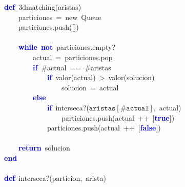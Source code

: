 \noindent
\mbox{}\textbf{\textcolor{Blue}{def}}\ 3dmatching\textcolor{BrickRed}{(}aristas\textcolor{BrickRed}{)} \\
\mbox{}\ \ \ \ particiones\ \textcolor{BrickRed}{=}\ new\ Queue \\
\mbox{}\ \ \ \ particiones\textcolor{BrickRed}{.}push\textcolor{BrickRed}{([])} \\
\mbox{} \\
\mbox{}\ \ \ \ \textbf{\textcolor{Blue}{while}}\ \textbf{\textcolor{Blue}{not}}\ particiones\textcolor{BrickRed}{.}empty? \\
\mbox{}\ \ \ \ \ \ \ \ actual\ \textcolor{BrickRed}{=}\ particiones\textcolor{BrickRed}{.}pop \\
\mbox{}\ \ \ \ \ \ \ \ \textbf{\textcolor{Blue}{if}}\ $\#$actual\ \textcolor{BrickRed}{==}\ $\#$aristas \\
\mbox{}\ \ \ \ \ \ \ \ \ \ \ \ \textbf{\textcolor{Blue}{if}}\ valor\textcolor{BrickRed}{(}actual\textcolor{BrickRed}{)}\ \textcolor{BrickRed}{\textgreater{}}\ valor\textcolor{BrickRed}{(}solucion\textcolor{BrickRed}{)} \\
\mbox{}\ \ \ \ \ \ \ \ \ \ \ \ \ \ \ \ solucion\ \textcolor{BrickRed}{=}\ actual \\
\mbox{}\ \ \ \ \ \ \ \ \textbf{\textcolor{Blue}{else}} \\
\mbox{}\ \ \ \ \ \ \ \ \ \ \ \ \textbf{\textcolor{Blue}{if}}\ interseca?\textcolor{BrickRed}{(}$\mathtt{aristas[\#actual]}$\textcolor{BrickRed}{,}\ actual\textcolor{BrickRed}{)} \\
\mbox{}\ \ \ \ \ \ \ \ \ \ \ \ \ \ \ \ particiones\textcolor{BrickRed}{.}push\textcolor{BrickRed}{(}actual\ \textcolor{BrickRed}{++}\ \textcolor{BrickRed}{[}\textbf{\textcolor{Blue}{true}}\textcolor{BrickRed}{])} \\
\mbox{}\ \ \ \ \ \ \ \ \ \ \ \ particiones\textcolor{BrickRed}{.}push\textcolor{BrickRed}{(}actual\ \textcolor{BrickRed}{++}\ \textcolor{BrickRed}{[}\textbf{\textcolor{Blue}{false}}\textcolor{BrickRed}{])} \\
\mbox{} \\
\mbox{}\ \ \ \ \textbf{\textcolor{Blue}{return}}\ solucion \\
\mbox{}\textbf{\textcolor{Blue}{end}} \\
\mbox{} \\
\mbox{}\textbf{\textcolor{Blue}{def}}\ interseca?\textcolor{BrickRed}{(}particion\textcolor{BrickRed}{,}\ arista\textcolor{BrickRed}{)} \\
